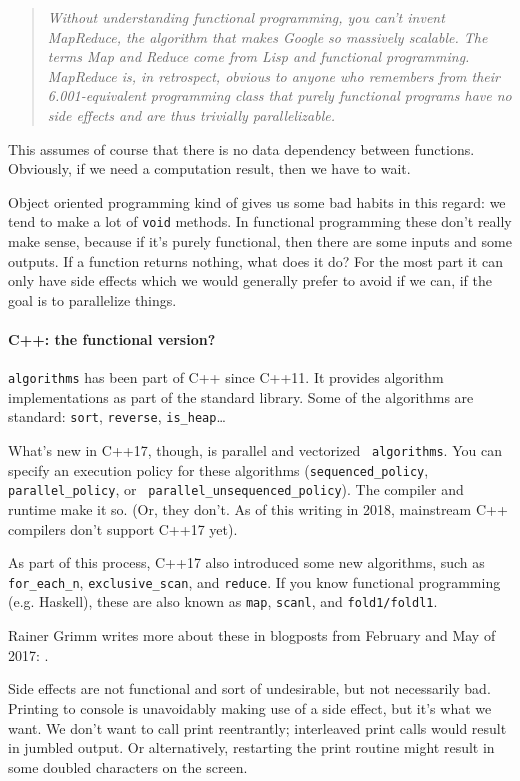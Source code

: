 \begin{quote}
\textit{Without understanding functional programming, you can't invent MapReduce, the algorithm that makes Google so massively scalable. The terms Map and Reduce come from Lisp and functional programming. MapReduce is, in retrospect, obvious to anyone who remembers from their 6.001-equivalent programming class that purely functional programs have no side effects and are thus trivially parallelizable.}~\cite{joel:functional}
\end{quote}

This assumes of course that there is no data dependency between functions. Obviously, if we need a computation result, then we have to wait. 

Object oriented programming kind of gives us some bad habits in this regard: we tend to make a lot of \texttt{void} methods. In functional programming these don't really make sense, because if it's purely functional, then there are some inputs and some outputs. If a function returns nothing, what does it do? For the most part it can only have side effects which we would generally prefer to avoid if we can, if the goal is to parallelize things. 

\paragraph{C++: the functional version?} {\tt algorithms} has been part of C++ since C++11. It provides algorithm implementations as part of the standard library. Some of the algorithms are standard: {\tt sort}, {\tt reverse}, {\tt is\_heap}\ldots

What's new in C++17, though, is parallel and vectorized {\tt
algorithms}. You can specify an execution policy for these algorithms
({\tt sequenced\_policy}, {\tt parallel\_policy}, or {\tt
parallel\_unsequenced\_policy}). The compiler and runtime make it
so. (Or, they don't. As of this writing in 2018, mainstream C++
compilers don't support C++17 yet).

As part of this process, C++17 also introduced some new algorithms, such as
{\tt for\_each\_n}, {\tt exclusive\_scan}, and {\tt reduce}.
If you know functional programming (e.g. Haskell), these are also known as
{\tt map}, {\tt scanl}, and {\tt fold1/foldl1}.

Rainer Grimm writes more about these in blogposts from February and May of 2017:
\cite{grimm17:_paral_algor_stand_templ_librar} \cite{grimm17:_c}.

Side effects are not functional and sort of undesirable, but not necessarily bad. Printing to console is unavoidably making use of a side effect, but it's what we want. We don't want to call print reentrantly; interleaved print calls would result in jumbled output. Or alternatively, restarting the print routine might result in some doubled characters on the screen.

